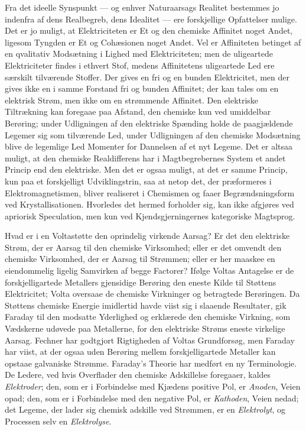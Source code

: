 \documentclass[12pt,a4paper]{book}
\begin{document}
Fra det ideelle Synspunkt --- og enhver Naturaarsags Realitet bestemmes jo
indenfra af dens Realbegreb, dens Idealitet --- ere forskjellige
Opfattelser mulige. Det er jo muligt, at Elektriciteten er Et og den
chemiske Affinitet noget Andet, ligesom Tyngden er Et og Cohæsionen noget
Andet. Vel er Affiniteten betinget af en qvalitativ Modsætning i Lighed
med Elektriciteten; men de uligeartede Elektriciteter findes i ethvert
Stof, medens Affinitetens uligeartede Led ere særskilt tilværende Stoffer.
Der gives en fri og en bunden Elektricitet, men der gives ikke en i samme
Forstand fri og bunden Affinitet; der kan tales om en elektrisk Strøm, men
ikke om en strømmende Affinitet. Den elektriske Tiltrækning kan foregaae
paa Afstand, den chemiske kun ved umiddelbar Berøring; under Udligningen
af den elektriske Spænding holde de paagjældende Legemer sig som
tilværende Led, under Udligningen af den chemiske Modsætning blive de
legemlige Led Momenter for Dannelsen af et nyt Legeme. Det er altsaa
muligt, at den chemiske Realdifferens har i Magtbegrebernes System et
andet Princip end den elektriske. Men det er ogsaa muligt, at det er samme
Princip, kun paa et forskjelligt Udviklingstrin, saa at netop det, der
præformeres i Elektromagnetismen, bliver realiseret i Chemismen og faaer
Begrændsningsform ved Krystallisationen. Hvorledes det hermed forholder
sig, kan ikke afgjøres ved apriorisk Speculation, men kun ved
Kjendsgjerningernes kategoriske Magtsprog.

Hvad er i en Voltastøtte den oprindelig virkende Aarsag? Er det den
elektriske Strøm, der er Aarsag til den chemiske Virksomhed; eller er det
omvendt den chemiske Virksomhed, der er Aarsag til Strømmen; eller er her
maaskee en eiendommelig ligelig Samvirken af begge Factorer? Ifølge Voltas
Antagelse er de forskjelligartede Metallers gjensidige Berøring den eneste
Kilde til Støttens Elektricitet; Volta oversaae de chemiske Virkninger og
betragtede Berøringen. Da Støttens chemiske Energie imidlertid havde viist
sig i slaaende Resultater, gik Faraday til den modsatte Yderlighed og
erklærede den chemiske Virkning, som Vædskerne udøvede paa Metallerne, for
den elektriske Strøms eneste virkelige Aarsag. Fechner har godtgjort
Rigtigheden af Voltas Grundforsøg, men Faraday har viist, at der ogsaa
uden Berøring mellem forskjelligartede Metaller kan opstaae galvaniske
Strømme. Faraday's Theorie har medført en ny Terminologie. De Ledere, ved
hvis Overflader den chemiske Adskillelse foregaaer, kaldes
\emph{Elektroder}; den, som er i Forbindelse med Kjædens positive Pol, er
\emph{Anoden}, Veien opad; den, som er i Forbindelse med den negative Pol,
er \emph{Kathoden}, Veien nedad; det Legeme, der lader sig chemisk
adskille ved Strømmen, er en \emph{Elektrolyt}, og Processen selv en
\emph{Elektrolyse}.
\end{document}
